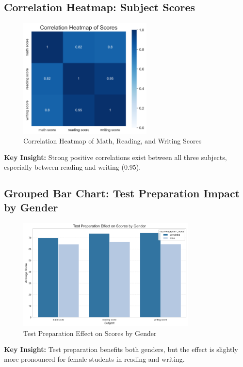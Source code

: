 \documentclass[12pt]{article}
\begin{document}
\subsection{Correlation Heatmap: Subject Scores}
\begin{figure}[H]
    \centering
    \includegraphics[width=0.6\textwidth]{figures/correlation_heatmap.png}
    \caption{Correlation Heatmap of Math, Reading, and Writing Scores}
\end{figure}
\textbf{Key Insight:} Strong positive correlations exist between all three subjects, especially between reading and writing (0.95).

\subsection{Grouped Bar Chart: Test Preparation Impact by Gender}
\begin{figure}[H]
    \centering
    \includegraphics[width=0.8\textwidth]{figures/grouped_barchart_testprep_by_gender.png}
    \caption{Test Preparation Effect on Scores by Gender}
\end{figure}
\textbf{Key Insight:} Test preparation benefits both genders, but the effect is slightly more pronounced for female students in reading and writing.
\end{document}
